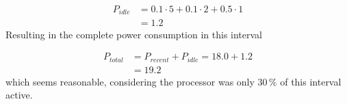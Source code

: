 %
\begin{align*}
P_{idle} &= 0.1 \cdot 5 + 0.1 \cdot 2 + 0.5 \cdot 1\\
&= 1.2
\end{align*}
%
Resulting in the complete power consumption in this interval

%
\begin{align*}
P_{total} &= P_{recent} + P_{idle} = 18.0 + 1.2\\
&= 19.2
\end{align*}
which seems reasonable, considering the processor was only 30\,\% of this interval active.